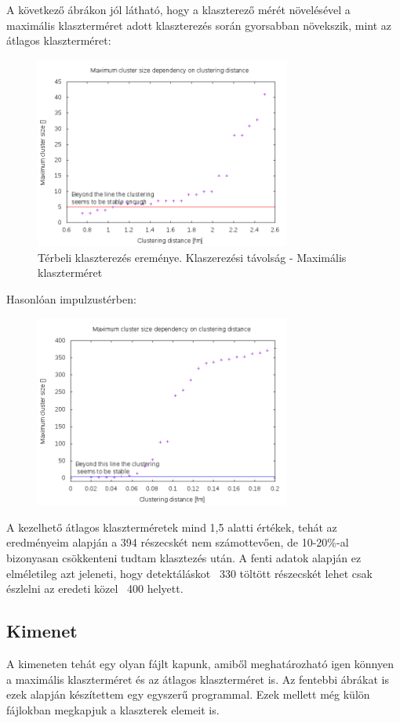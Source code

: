 \documentclass[a4paper,12pt]{article}
\begin{document}
\par A következő ábrákon jól látható, hogy a klaszterező mérét növelésével a maximális klaszterméret adott klaszterezés során gyorsabban
növekszik, mint az átlagos klaszterméret:
\begin{figure}[H]
	\centering
	\includegraphics[width=0.75\textwidth]{dist-max.png}
	\caption{ Térbeli klaszterezés ereménye. Klaszerezési távolság - Maximális klaszterméret }
\end{figure}
\par Hasonlóan impulzustérben:
\begin{figure}[H]
	\centering
	\includegraphics[width=0.75\textwidth]{momdist-max.png}
\end{figure}
\par A kezelhető átlagos klaszterméretek mind 1,5 alatti értékek, tehát az eredményeim alapján a 394 részecskét nem számottevően, de 10-20\%-al bizonyasan csökkenteni tudtam klasztezés után. A fenti adatok 
alapján ez elméletileg azt jeleneti, hogy detektáláskot ~330 töltött részecskét lehet csak észlelni az eredeti közel ~400 helyett. 
\subsection{ Kimenet}
\par A kimeneten tehát egy olyan fájlt kapunk, amiből meghatározható igen könnyen a maximális klaszterméret és az átlagos klaszterméret is.
Az fentebbi ábrákat is ezek alapján készítettem egy egyszerű programmal. Ezek mellett még külön fájlokban megkapjuk a klaszterek elemeit is.
\end{document}
